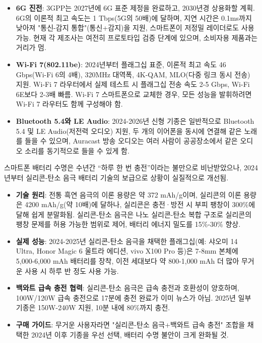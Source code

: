 \begin{itemize}
  \item \textbf{6G 진전}: 3GPP는 2027년에 6G 표준 제정을 완료하고, 2030년경 상용화할 계획. 6G의 이론적 최고 속도는 1 Tbps(5G의 50배)에 달하며, 지연 시간은 0.1ms까지 낮아져 "통신-감지 통합"(통신+감지)을 지원, 스마트폰이 저정밀 레이더로도 사용 가능. 현재 각 제조사는 여전히 프로토타입 검증 단계에 있으며, 소비자용 제품과는 거리가 멈.
  \item \textbf{Wi-Fi 7(802.11be)}: 2024년부터 플래그십 표준, 이론적 최고 속도 46 Gbps(Wi-Fi 6의 4배), 320MHz 대역폭, 4K-QAM, MLO(다중 링크 동시 전송) 지원. Wi-Fi 7 라우터에서 실제 테스트 시 플래그십 전송 속도 2-5 Gbps, Wi-Fi 6E보다 2-3배 빠름. Wi-Fi 7 스마트폰으로 교체한 경우, 모든 성능을 발휘하려면 Wi-Fi 7 라우터도 함께 구성해야 함.
  \item \textbf{Bluetooth 5.4와 LE Audio}: 2024-2026년 신형 기종은 일반적으로 Bluetooth 5.4 및 LE Audio(저전력 오디오) 지원, 두 개의 이어폰을 동시에 연결해 같은 노래를 들을 수 있으며, Auracast 방송 오디오는 여러 사람이 공공장소에서 같은 오디오 소리를 동기적으로 들을 수 있게 함.
\end{itemize}


스마트폰 배터리 수명은 수년간 “하루 한 번 충전”이라는 불만으로 비난받았으나, 2024년부터 실리콘-탄소 음극 배터리 기술의 보급으로 상황이 실질적으로 개선됨.

\begin{itemize}
  \item \textbf{기술 원리}: 전통 흑연 음극의 이론 용량은 약 372 mAh/g이며, 실리콘의 이론 용량은 4200 mAh/g(약 10배)에 달하나, 실리콘은 충전·방전 시 부피 팽창이 300\%에 달해 쉽게 분말화됨. 실리콘-탄소 음극은 나노 실리콘-탄소 복합 구조로 실리콘의 팽창 문제를 허용 가능한 범위로 제어, 배터리 에너지 밀도를 15\%-30\% 향상.
  \item \textbf{실제 성능}: 2024-2025년 실리콘-탄소 음극을 채택한 플래그십(예: 샤오미 14 Ultra, Honor Magic 6 울트라 에디션, vivo X100 Pro 등)은 7-8mm 본체에 5,000-6,000 mAh 배터리를 장착, 이전 세대보다 약 800-1,000 mAh 더 많아 무거운 사용 시 하루 반 정도 사용 가능.
  \item \textbf{백와트 급속 충전 협력}: 실리콘-탄소 음극은 급속 충전과 호환성이 양호하며, 100W/120W 급속 충전으로 17분에 충전 완료가 이미 뉴스가 아님. 2025년 일부 기종은 150W-240W 지원, 10분 내에 80\%까지 충전.
  \item \textbf{구매 가이드}: 무거운 사용자라면 "실리콘-탄소 음극+백와트 급속 충전" 조합을 채택한 2024년 이후 기종을 우선 선택, 배터리 수명 불안이 크게 완화될 것.
\end{itemize}

